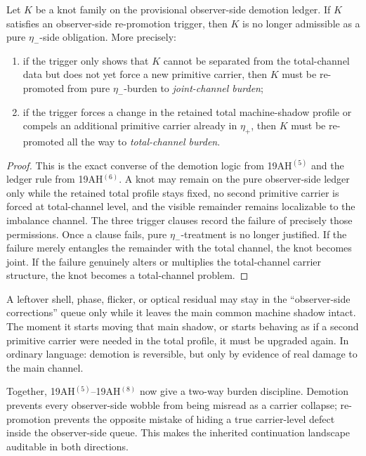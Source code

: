 \begin{proposition}
Let \(K\) be a knot family on the provisional observer-side demotion ledger. If \(K\) satisfies an observer-side re-promotion trigger, then \(K\) is no longer admissible as a pure \(\eta_-\)-side obligation. More precisely:
\begin{enumerate}[leftmargin=2em]
  \item if the trigger only shows that \(K\) cannot be separated from the total-channel data but does not yet force a new primitive carrier, then \(K\) must be re-promoted from pure \(\eta_-\)-burden to \emph{joint-channel burden};
  \item if the trigger forces a change in the retained total machine-shadow profile or compels an additional primitive carrier already in \(\eta_+\), then \(K\) must be re-promoted all the way to \emph{total-channel burden}.
\end{enumerate}
\end{proposition}

\begin{proof}
This is the exact converse of the demotion logic from 19AH$^{(5)}$ and the ledger rule from 19AH$^{(6)}$. A knot may remain on the pure observer-side ledger only while the retained total profile stays fixed, no second primitive carrier is forced at total-channel level, and the visible remainder remains localizable to the imbalance channel. The three trigger clauses record the failure of precisely those permissions. Once a clause fails, pure \(\eta_-\)-treatment is no longer justified. If the failure merely entangles the remainder with the total channel, the knot becomes joint. If the failure genuinely alters or multiplies the total-channel carrier structure, the knot becomes a total-channel problem.
\end{proof}

\begin{corollary}
A leftover shell, phase, flicker, or optical residual may stay in the ``observer-side corrections'' queue only while it leaves the main common machine shadow intact. The moment it starts moving that main shadow, or starts behaving as if a second primitive carrier were needed in the total profile, it must be upgraded again. In ordinary language: demotion is reversible, but only by evidence of real damage to the main channel.
\end{corollary}

\begin{remark}
Together, 19AH$^{(5)}$--19AH$^{(8)}$ now give a two-way burden discipline. Demotion prevents every observer-side wobble from being misread as a carrier collapse; re-promotion prevents the opposite mistake of hiding a true carrier-level defect inside the observer-side queue. This makes the inherited continuation landscape auditable in both directions.
\end{remark}

